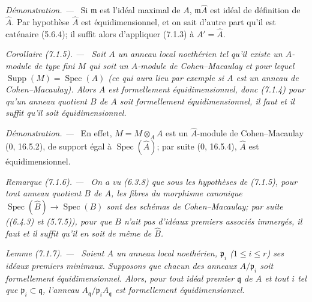 \documentclass[10pt,oneside]{book}
\newcommand{\oldpage}[2][]{%
  \setcounter{footnote}{0}%
  \marginpar{\scriptsize\textbf{#1}~|~#2}\ignorespaces}
\newenvironment{corollary}[1][]{%
  \par\medskip\noindent\itshape Corollaire (#1). ---\ }{\par}
\newenvironment{remark}[1][]{%
  \par\medskip\noindent\itshape Remarque (#1). ---\ }{\par}
\newenvironment{lemma}[1][]{%
  \par\medskip\noindent\itshape Lemme (#1). ---\ }{\par}
\newenvironment{proof}{%
  \par\medskip\noindent\textit{Démonstration. ---\ }}{\par}
\begin{document}
\begin{proof}
Si $\mathfrak m$ est l'idéal maximal de $A$, $\mathfrak m\widehat A$ est
idéal de définition de $\widehat A$. Par hypothèse $\widehat A$ est
équidimensionnel, et on sait d'autre part qu'il est caténaire (5.6.4); il
suffit alors d'appliquer (7.1.3) à $A'=\widehat A$.
\end{proof}

\begin{corollary}[7.1.5]
\label{IV.2.s7.1.5-fr}
Soit $A$ un anneau local noethérien tel qu'il existe un $A$-module de type
fini $M$ qui soit un $A$-module de Cohen--Macaulay et pour lequel
$\operatorname{Supp}(M)=\operatorname{Spec}(A)$ (ce qui aura lieu par
exemple si $A$ est un anneau de Cohen--Macaulay). Alors $A$ est formellement
équidimensionnel, donc (7.1.4) pour qu'un anneau quotient $B$ de $A$ soit
formellement équidimensionnel, il faut et il suffit qu'il soit
équidimensionnel.
\end{corollary}

\begin{proof}
\oldpage[IV-2]{185}
En effet, $\widehat M=M\otimes_A\widehat A$ est un $\widehat A$-module de
Cohen--Macaulay (0, 16.5.2), de support égal à
$\operatorname{Spec}(\widehat A)$; par suite (0, 16.5.4), $\widehat A$ est
équidimensionnel.
\end{proof}

\begin{remark}[7.1.6]
\label{IV.2.s7.1.6-fr}
On a vu (6.3.8) que sous les hypothèses de (7.1.5), pour tout anneau quotient
$B$ de $A$, les fibres du morphisme canonique
$\operatorname{Spec}(\widehat B)\to\operatorname{Spec}(B)$ sont des schémas
de Cohen--Macaulay; par suite ((6.4.3) et (5.7.5)), \emph{pour que $B$ n'ait
pas d'idéaux premiers associés immergés, il faut et il suffit qu'il en soit
de même de $\widehat B$}.
\end{remark}

\begin{lemma}[7.1.7]
\label{IV.2.s7.1.7-fr}
Soient $A$ un anneau local noethérien, $\mathfrak p_i$
($1\leqslant i\leqslant r$) ses idéaux premiers minimaux. Supposons que
chacun des anneaux $A/\mathfrak p_i$ soit formellement équidimensionnel.
Alors, pour tout idéal premier $\mathfrak q$ de $A$ et tout $i$ tel que
$\mathfrak p_i\subset\mathfrak q$, l'anneau
$A_{\mathfrak q}/\mathfrak p_iA_{\mathfrak q}$ est formellement
équidimensionnel.
\end{lemma}
\end{document}
